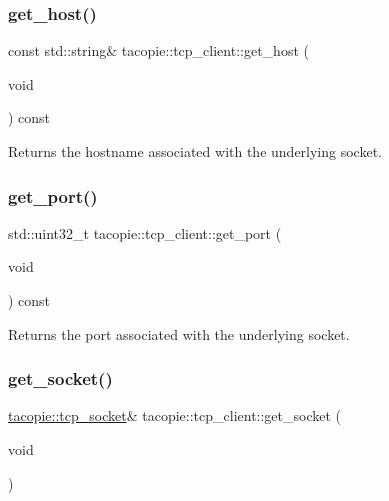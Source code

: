\subsubsection{\texorpdfstring{get\+\_\+host()}{get\_host()}}
{\footnotesize\ttfamily const std\+::string\& tacopie\+::tcp\+\_\+client\+::get\+\_\+host (\begin{DoxyParamCaption}\item[{void}]{ }\end{DoxyParamCaption}) const}

\begin{DoxyReturn}{Returns}
the hostname associated with the underlying socket. 
\end{DoxyReturn}
\mbox{\label{classtacopie_1_1tcp__client_a3b42ae2afe6d5ee5f2f16b8bd7846f37}} 
\subsubsection{\texorpdfstring{get\+\_\+port()}{get\_port()}}
{\footnotesize\ttfamily std\+::uint32\+\_\+t tacopie\+::tcp\+\_\+client\+::get\+\_\+port (\begin{DoxyParamCaption}\item[{void}]{ }\end{DoxyParamCaption}) const}

\begin{DoxyReturn}{Returns}
the port associated with the underlying socket. 
\end{DoxyReturn}
\mbox{\label{classtacopie_1_1tcp__client_a1a3834deb1d263ec5816066f74286298}} 
\subsubsection{\texorpdfstring{get\+\_\+socket()}{get\_socket()}\hspace{0.1cm}{\footnotesize\ttfamily [1/2]}}
{\footnotesize\ttfamily \hyperlink{classtacopie_1_1tcp__socket}{tacopie\+::tcp\+\_\+socket}\& tacopie\+::tcp\+\_\+client\+::get\+\_\+socket (\begin{DoxyParamCaption}\item[{void}]{ }\end{DoxyParamCaption})}

